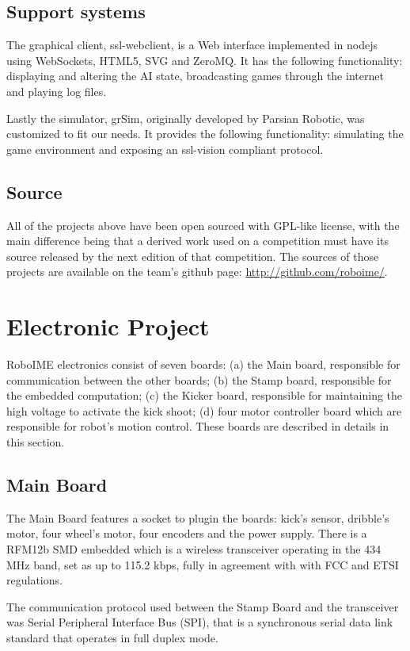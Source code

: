 \documentclass{llncs}
\begin{document}
\subsection{Support systems}

The graphical client, ssl-webclient, is a Web interface implemented in nodejs using WebSockets, HTML5, SVG and ZeroMQ.
It has the following functionality: displaying and altering the AI state, broadcasting games through the internet and playing log files.

Lastly the simulator, grSim, originally developed by Parsian Robotic, was customized to fit our needs.
It provides the following functionality: simulating the game environment and exposing an ssl-vision compliant protocol.

\subsection{Source}

All of the projects above have been open sourced with GPL-like license, with the main difference being that a derived work used on a competition must have its source released by the next edition of that competition. The sources of those projects are available on the team's github page: \url{http://github.com/roboime/}.

\section{Electronic Project}
RoboIME electronics consist of seven boards: (a) the Main board, responsible for communication between the other boards; (b) the Stamp board,  responsible  for the embedded computation; (c) the Kicker board, responsible for maintaining the high voltage to activate the kick shoot; (d) four motor controller board which are responsible for robot's motion control. These boards are described in details in this section.

\subsection{Main Board}
The Main Board features a socket to plugin the boards: kick's sensor, dribble's motor, four wheel's motor, four encoders and the power supply. There is a RFM12b SMD embedded which is a wireless transceiver operating in the 434 MHz band, set as up to 115.2 kbps, fully in agreement with with FCC and ETSI regulations.

The communication protocol used between the Stamp Board and the transceiver was Serial Peripheral Interface Bus (SPI), that  is a synchronous serial data link standard that operates in full duplex mode.
\end{document}
